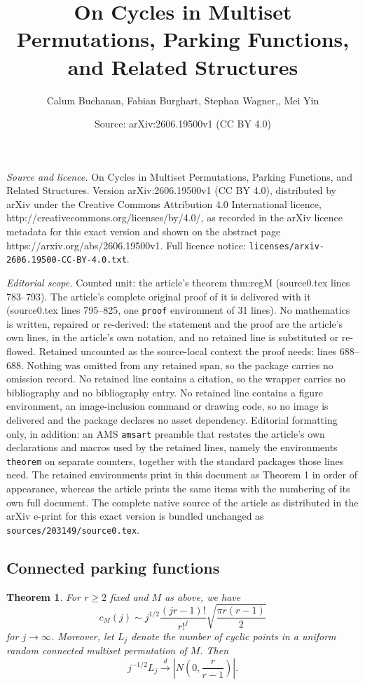 \documentclass[10pt,a4paper]{amsart}
\title{On Cycles in Multiset Permutations, Parking Functions, and Related Structures}
\author{Calum Buchanan, Fabian Burghart, Stephan Wagner,, Mei Yin}
\date{Source: arXiv:2606.19500v1 (CC BY 4.0)}
\newtheorem{theorem}{Theorem}
\newcommand{\dto}{\stackrel{d}{\longrightarrow}}
\begin{document}
\maketitle

\noindent\emph{Source and licence.} On Cycles in Multiset Permutations, Parking Functions, and Related Structures. Version arXiv:2606.19500v1 (CC BY 4.0), distributed by arXiv under the Creative Commons Attribution 4.0 International licence, http://creativecommons.org/licenses/by/4.0/, as recorded in the arXiv licence metadata for this exact version and shown on the abstract page https://arxiv.org/abs/2606.19500v1. Full licence notice: \texttt{licenses/arxiv-2606.19500-CC-BY-4.0.txt}.\par\smallskip

\noindent\textit{Editorial scope.} Counted unit: the article's theorem thm:regM (source0.tex lines 783--793). The article's complete original proof of it is delivered with it (source0.tex lines 795--825, one \texttt{proof} environment of 31 lines). No mathematics is written, repaired or re-derived: the statement and the proof are the article's own lines, in the article's own notation, and no retained line is substituted or re-flowed.  Retained uncounted as the source-local context the proof needs: lines 688--688.  Nothing was omitted from any retained span, so the package carries no omission record.  No retained line contains a citation, so the wrapper carries no bibliography and no bibliography entry.  No retained line contains a figure environment, an image-inclusion command or drawing code, so no image is delivered and the package declares no asset dependency.  Editorial formatting only, in addition: an AMS \texttt{amsart} preamble that restates the article's own declarations and macros used by the retained lines, namely the environments \texttt{theorem} on separate counters, together with the standard packages those lines need.  The retained environments print in this document as Theorem 1 in order of appearance, whereas the article prints the same items with the numbering of its own full document.  The complete native source of the article as distributed in the arXiv e-print for this exact version is bundled unchanged as \texttt{sources/203149/source0.tex}.
\subsection{Connected parking functions}\label{subsec:cpf}

\begin{theorem}\label{thm:regM}
 For $r\geq 2$ fixed and $M$ as above, we have
 \begin{equation}\label{eq:thmregM1}
  c_M(j)
  \sim j^{1/2} \frac{(jr-1)!}{r!^{j}} \sqrt{\frac{\pi r(r-1)}{2}}
 \end{equation}
 for $j\to\infty$. Moreover, let $L_j$ denote the number of cyclic points in a uniform random connected multiset permutation of $M$. Then
 \begin{equation*}
  j^{-1/2} L_j \dto \left|N\left(0,\frac{r}{r-1}\right)\right|.
 \end{equation*}
\end{theorem}
\end{document}
